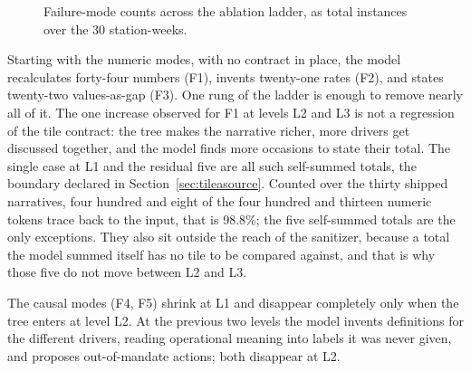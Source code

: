 \documentclass[12pt,a4paper,openright,twoside]{book}
\begin{document}
\begin{figure}[ht]
  \caption{Failure-mode counts across the ablation ladder, as total instances over the 30 station-weeks.}
  \label{fig:descent}
  \end{figure}


Starting with the numeric modes, with no contract in place, the model recalculates forty-four numbers (F1), invents twenty-one rates (F2), and states twenty-two values-as-gap (F3).
One rung of the ladder is enough to remove nearly all of it.
The one increase observed for F1 at levels L2 and L3 is not a regression of the tile contract: the tree makes the narrative richer, more drivers get discussed together, and the model finds more occasions to state their total.
The single case at L1 and the residual five are all such self-summed totals, the boundary declared in Section~\ref{sec:tileasource}.
Counted over the thirty shipped narratives, four hundred and eight of the four hundred and thirteen numeric tokens trace back to the input, that is 98.8\%; the five self-summed totals are the only exceptions.
They also sit outside the reach of the sanitizer, because a total the model summed itself has no tile to be compared against, and that is why those five do not move between L2 and L3. 

The causal modes (F4, F5) shrink at L1 and disappear completely only when the tree enters at level L2.
At the previous two levels the model invents definitions for the different drivers, reading operational meaning into labels it was never given, and proposes out-of-mandate actions; both disappear at L2.
\end{document}
